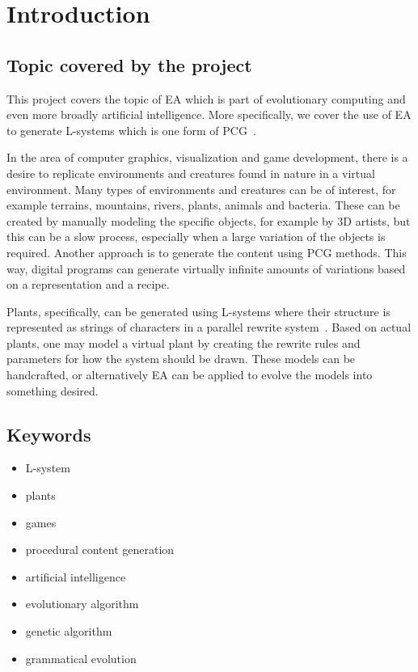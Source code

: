 \chapter{Introduction}
\label{chap:introduction}

\section{Topic covered by the project}

This project covers the topic of \gls{EA} which is part of evolutionary computing and even more broadly artificial intelligence.
More specifically, we cover the use of \gls{EA} to generate \glspl{L-system} which is one form of \gls{PCG}~\cite{PCG_5}.

In the area of computer graphics, visualization and game development, there is a desire to replicate environments and creatures found in nature in a virtual environment. %
Many types of environments and creatures can be of interest, for example terrains, mountains, rivers, plants, animals and bacteria.
These can be created by manually modeling the specific objects, for example by 3D artists, but this can be a slow process, especially when a large variation of the objects is required.
Another approach is to generate the content using \gls{PCG} methods.
This way, digital programs can generate virtually infinite amounts of variations based on a representation and a recipe.

Plants, specifically, can be generated using \glspl{L-system} where their structure is represented as strings of characters in a parallel rewrite system~\cite{2012Prusinkiewicz}.
Based on actual plants, one may model a virtual plant by creating the rewrite rules and parameters for how the system should be drawn.
These models can be handcrafted, or alternatively \gls{EA} can be applied to evolve the models into something desired.

\section{Keywords}
\begin{itemize}
    \item L-system
    \item plants
    \item games
    \item procedural content generation
    \item artificial intelligence
    \item evolutionary algorithm
    \item genetic algorithm
    \item grammatical evolution
\end{itemize}

